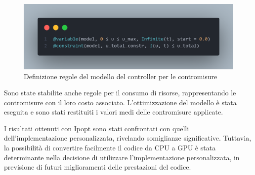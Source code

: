 \begin{figure}[H]
	\begin{center}
		\includegraphics[width=\textwidth]{img/controller_rules_1.png}
		\caption{Definizione regole del modello del controller per le contromisure}
		\label{fig:controller_rules_1}	
    \end{center}
\end{figure}

Sono state stabilite anche regole per il consumo di risorse, 
rappresentando le contromisure con il loro costo associato. 
L'ottimizzazione del modello è stata eseguita e sono stati restituiti 
i valori medi delle contromisure applicate.

I risultati ottenuti con Ipopt sono stati confrontati con quelli 
dell'implementazione personalizzata, rivelando somiglianze 
significative. Tuttavia, la possibilità di convertire facilmente 
il codice da CPU a GPU è stata determinante nella decisione di 
utilizzare l'implementazione personalizzata, in previsione di futuri 
miglioramenti delle prestazioni del codice.


